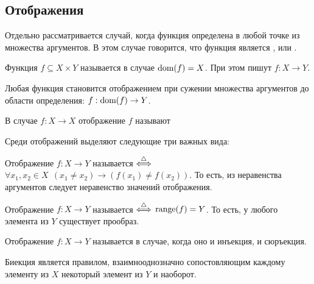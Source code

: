 \subsection{Отображения}
\label{subsec:functions:mappings}

Отдельно рассматривается случай, когда функция определена в любой точке из множества аргументов.
В этом случае говорится, что функция является , или .

\begin{definition}
    Функция $ f \subseteq X \times Y $ называется  в случае $ \operatorname*{\textnormal{dom}}(f) = X $.
    При этом пишут $ f: X \to Y $.
\end{definition}

\begin{remark}
    Любая функция становится отображением при сужении множества аргументов до области определения: $ f: \operatorname*{\textnormal{dom}}(f) \to Y $.
\end{remark}

\begin{definition}
    В случае $ f: X \to X $ отображение $ f $ называют 
\end{definition}

Среди отображений выделяют следующие три важных вида:

\begin{definition}
    Отображение $ f: X \to Y $ называется  $ \overset{\triangle}{\Longleftrightarrow} $ $ \forall x_1, x_2 \in X \;\, (x_1 \neq x_2) \rightarrow (f(x_1) \neq f(x_2)) $.
    То есть, из неравенства аргументов следует неравенство значений отображения.
\end{definition}

\begin{definition}
    Отображение $ f: X \to Y $ называется  $ \overset{\triangle}{\Longleftrightarrow} $ $ \operatorname*{\textnormal{range}}(f) = Y $.
    То есть, у любого элемента из $ Y $ существует прообраз.
\end{definition}

\begin{definition}
    Отображение $ f: X \to Y $ называется  в случае, когда оно и инъекция, и сюръекция.
\end{definition}

\begin{remark}
    Биекция является правилом, взаимнооднозначно сопостовляющим каждому элементу из $ X $ некоторый элемент из $ Y $ и наоборот.
\end{remark}

